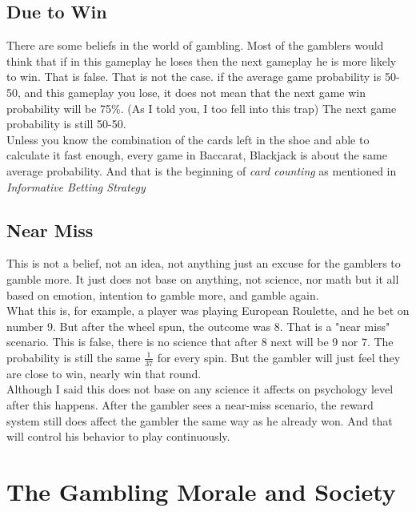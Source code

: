\documentclass{article}
\begin{document}
\subsection{Due to Win}
There are some beliefs in the world of gambling.  Most of the gamblers would think that if in this gameplay he loses then the next gameplay he is more likely to win.   That is false.  That is not the case.  if the average game probability is 50-50, and this gameplay you lose, it does not mean that the next game win probability will be 75\%.  (As I told you, I too fell into this trap) The next game probability is still 50-50. \\

Unless you know the combination of the cards left in the shoe and able to calculate it fast enough, every game in Baccarat, Blackjack is about the same average probability.  And that is the beginning of \emph{card counting} as mentioned in \emph{Informative Betting Strategy}\\

\subsection{Near Miss}
This is not a belief, not an idea, not anything just an excuse for the gamblers to gamble more.  It just does not base on anything, not science, nor math but it all based on emotion, intention to gamble more, and gamble again.\\

What this is, for example, a player was playing European Roulette, and he bet on number 9.  But after the wheel spun, the outcome was 8.  That is a "near miss" scenario.  This is false, there is no science that after 8 next will be 9 nor 7.  The probability is still the same $\frac{1}{37}$ for every spin.  But the gambler will just feel they are close to win, nearly win that round.\\

Although I said this does not base on any science it affects on psychology level after this happens.  After the gambler sees a near-miss scenario, the reward system still does affect the gambler the same way as he already won.  And that will control his behavior to play continuously. \\



\clearpage
\section{The Gambling Morale and Society}
\end{document}
